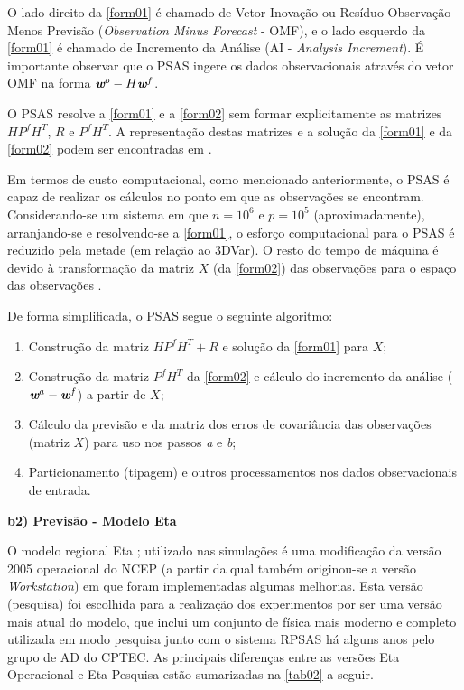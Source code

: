 O lado direito da \autoref{form01} é chamado de Vetor Inovação ou Resíduo Observação Menos Previsão (\textit{Observation Minus Forecast} - OMF), e o lado esquerdo da \autoref{form01} é chamado de Incremento da Análise (AI - \textit{Analysis Increment}). É importante observar que o PSAS ingere os dados observacionais através do vetor OMF na forma $\textit{\textbf{w}}^o-H\textit{\textbf{w}}^f$.

O PSAS resolve a \autoref{form01} e a \autoref{form02} sem formar explicitamente as matrizes $HP^{f}H^{T}$, $R$ e $P^{f}H^{T}$. A representação destas matrizes e a solução da \autoref{form01} e da \autoref{form02} podem ser encontradas em .

Em termos de custo computacional, como mencionado anteriormente, o PSAS é capaz de realizar os cálculos no ponto em que as observações se encontram. Considerando-se um sistema em que $n=10^{6}$ e $p=10^{5}$ (aproximadamente), arranjando-se e resolvendo-se a \autoref{form01}, o esforço computacional para o PSAS é reduzido pela metade (em relação ao 3DVar). O resto do tempo de máquina é devido à transformação da matriz $X$ (da \autoref{form02}) das observações para o espaço das observações \cite{cohnetal98}.

De forma simplificada, o PSAS segue o seguinte algoritmo:

\begin{enumerate}
\item Construção da matriz $HP^{f}H^{T}+R$ e solução da \autoref{form01} para $X$;
\item Construção da matriz $P^{f}H^{T}$ da \autoref{form02} e cálculo do incremento da análise ($\textit{\textbf{w}}^a-\textit{\textbf{w}}^f$) a partir de $X$;
\item Cálculo da previsão e da matriz dos erros de covariância das observações (matriz $X$) para uso nos passos \textit{a} e \textit{b};
\item Particionamento (tipagem) e outros processamentos nos dados observacionais de entrada.
\end{enumerate}

\textbf{b2) Previsão - Modelo Eta}

O modelo regional Eta \cite{mesingeretal88}; \cite{black94} utilizado nas simulações é uma modificação da versão 2005 operacional do NCEP (a partir da qual também originou-se a versão \textit{Workstation}) em que foram implementadas algumas melhorias. Esta versão (pesquisa) foi escolhida para a realização dos experimentos por ser uma versão mais atual do modelo, que inclui um conjunto de física mais moderno e completo utilizada em modo pesquisa junto com o sistema RPSAS há alguns anos pelo grupo de AD do CPTEC. As principais diferenças entre as versões Eta Operacional e Eta Pesquisa estão sumarizadas na \autoref{tab02} a seguir.

